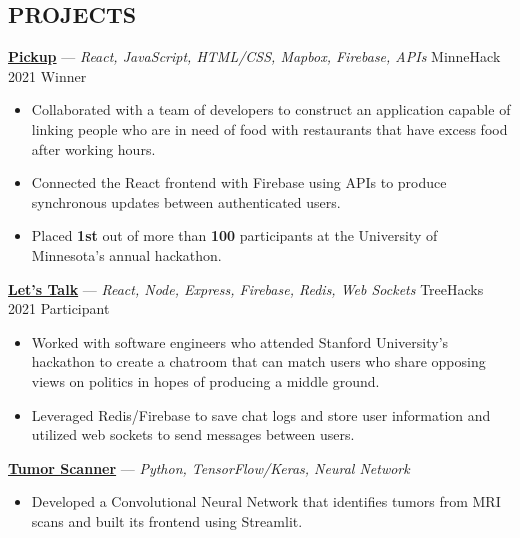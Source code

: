 \documentclass[11pt]{res}
\begin{document}
\begin{footnotesize}
\begin{resume}
\begin{small}
\section{PROJECTS}
\end{small} 
\vspace{.5mm}
\href{https://devpost.com/software/pickup-7b8yhx}{\textbf{Pickup}} — {\sl React, JavaScript, HTML/CSS, Mapbox, Firebase, APIs} \hfill MinneHack 2021 Winner\vspace{-4.5mm}
\begin{itemize}[leftmargin=6.25mm] \itemsep -2pt 
\item Collaborated with a team of developers to construct an application capable of linking people who are in need of food with restaurants that have excess food after working hours.
\vspace{1.30mm}
\item Connected the React frontend with Firebase using APIs to produce synchronous updates between authenticated users.
\vspace{1.30mm}
\item Placed \textbf{1st} out of more than \textbf{100} participants at the University of Minnesota's annual hackathon. 
\end{itemize}
\vspace{-2.5mm}
\href{https://devpost.com/software/let-s-talk-7si84k}{\textbf{Let's Talk}} — {\sl React, Node, Express, Firebase, Redis, Web Sockets} \hfill TreeHacks 2021 Participant\vspace{-4.5mm}
\begin{itemize}[leftmargin=6.25mm] \itemsep -2pt 
\item Worked with software engineers who attended Stanford University's hackathon to create a chatroom that can match users who share opposing views on politics in hopes of producing a middle ground. 
\vspace{1.30mm}
\item Leveraged Redis/Firebase to save chat logs and store user information and utilized web sockets to send messages between users. 
\end{itemize}
\vspace{-2.5mm}
\href{https://github.com/CharlesShi12/AI_Tumor_Scanner}{\textbf{Tumor Scanner}} — {\sl Python, TensorFlow/Keras, Neural Network}\vspace{-4.5mm}
\begin{itemize}[leftmargin=6.25mm] \itemsep -2pt 
\item Developed a Convolutional Neural Network that identifies tumors from MRI scans and built its frontend using Streamlit.

\end{itemize}
\end{resume}
\end{footnotesize}
\end{document}
